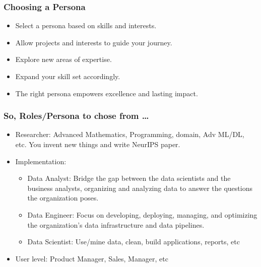 \begin{frame}[fragile]\frametitle{Choosing a Persona}
        \begin{itemize}
            \item Select a persona based on skills and interests.
            \item Allow projects and interests to guide your journey.
            \item Explore new areas of expertise.
            \item Expand your skill set accordingly.
            \item The right persona empowers excellence and lasting impact.
        \end{itemize}
\end{frame}


\begin{frame}[fragile]\frametitle{So, Roles/Persona to chose from \ldots}
\begin{itemize}
\item Researcher: Advanced Mathematics, Programming, domain, Adv ML/DL, etc. You invent new things and write NeurIPS paper.
\item Implementation:
	\begin{itemize}
	\item Data Analyst: Bridge the gap between the data scientists and the business analysts, organizing and analyzing data to answer the questions the organization poses. 
	\item Data Engineer: Focus on developing, deploying, managing, and optimizing the organization’s data infrastructure and data pipelines.
	\item Data Scientist: Use/mine data, clean, build applications, reports, etc
	\end{itemize}
\item User level: Product Manager, Sales, Manager, etc
\end{itemize}
\end{frame}
